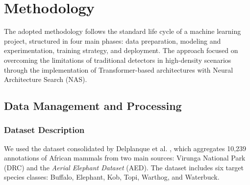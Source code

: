 \section{Methodology}

The adopted methodology follows the standard life cycle of a machine learning project, structured in four main phases: data preparation, modeling and experimentation, training strategy, and deployment. The approach focused on overcoming the limitations of traditional detectors in high-density scenarios through the implementation of Transformer-based architectures with Neural Architecture Search (NAS).

\subsection{Data Management and Processing}

\subsubsection{Dataset Description}

We used the dataset consolidated by Delplanque et al. \cite{delplanque-data}, which aggregates 10,239 annotations of African mammals from two main sources: Virunga National Park (DRC) and the \textit{Aerial Elephant Dataset} (AED). The dataset includes six target species classes: Buffalo, Elephant, Kob, Topi, Warthog, and Waterbuck.

